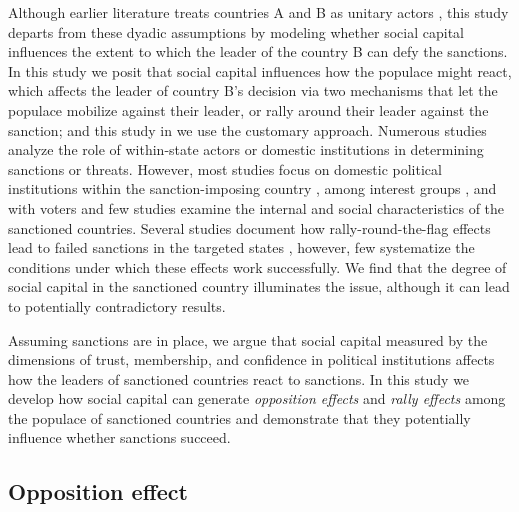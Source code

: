 \documentclass[12pt,]{article}
\begin{document}
Although earlier literature treats countries A and B as unitary actors
\citep{lacy2004a}, this study departs from these dyadic assumptions by
modeling whether social capital influences the extent to which the
leader of the country B can defy the sanctions. In this study we posit
that social capital influences how the populace might react, which
affects the leader of country B's decision via two mechanisms that let
the populace mobilize against their leader, or rally around their leader
against the sanction; and this study in we use the customary approach.
Numerous studies analyze the role of within-state actors or domestic
institutions in determining sanctions or threats. However, most studies
focus on domestic political institutions within the sanction-imposing
country \citep{cox2006a}, among interest groups \citep{kaempfer1992a},
and with voters \citep{mcgillivray2004a} and few studies examine the
internal and social characteristics of the sanctioned countries. Several
studies document how rally-round-the-flag effects lead to failed
sanctions in the targeted states \citep{allen2005a, allen2008a},
however, few systematize the conditions under which these effects work
successfully. We find that the degree of social capital in the
sanctioned country illuminates the issue, although it can lead to
potentially contradictory results.

Assuming sanctions are in place, we argue that social capital measured
by the dimensions of trust, membership, and confidence in political
institutions affects how the leaders of sanctioned countries react to
sanctions. In this study we develop how social capital can generate
\emph{opposition effects} and \emph{rally effects} among the populace of
sanctioned countries and demonstrate that they potentially influence
whether sanctions succeed.

\hypertarget{opposition-effect}{%
\subsection{Opposition effect}\label{opposition-effect}}
\end{document}
